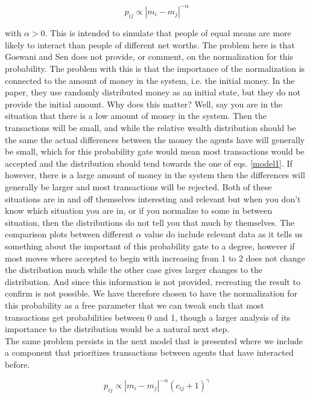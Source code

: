 \documentclass[a4paper,11pt]{article}
\begin{document}
{\begin{equation}
p_{ij} \propto |m_i - m_j|^{-\alpha}
\label{model3}
\end{equation}

with $\alpha > 0$. This is intended to simulate that people of equal means are more likely to interact than people of different net worths. The problem here is that Goswani and Sen does not provide, or comment, on the normalization for this probability. The problem with this is that the importance of the normalization is connected to the amount of money in the system, i.e. the initial money. In the paper, they use randomly distributed money as an initial state, but they do not provide the initial amount. Why does this matter? Well, say you are in the situation that there is a low amount of money in the system. Then the transactions will be small, and while the relative wealth distribution should be the same the actual differences between the money the agents have will generally be small, which for this probability gate would mean most transactions would be accepted and the distribution should tend towards the one of eqs. \ref{model1}. If however, there is a large amount of money in the system then the differences will generally be larger and most transactions will be rejected. Both of these situations are in and off themselves interesting and relevant but when you don't know which situation you are in, or if you normalize to some in between situation, then the distributions do not tell you that much by themselves. The comparison plots between different $\alpha$ value do include relevant data as it tells us something about the important of this probability gate to a degree, however if most moves where accepted to begin with increasing from 1 to 2 does not change the distribution much while the other case gives larger changes to the distribution. And since this information is not provided, recreating the result to confirm is not possible. We have therefore chosen to have the normalization for this probability as a free parameter that we can tweak such that most transactions get probabilities between 0 and 1, though a larger analysis of its importance to the distribution would be a natural next step.\\

The same problem persists in the next model that is presented where we include a component that prioritizes transactions between agents that have interacted before.

\begin{equation}
p_{ij} \propto |m_i - m_j|^{-\alpha}(c_{ij} + 1)^{\gamma}
\label{model4}
\end{equation}

}
\end{document}
